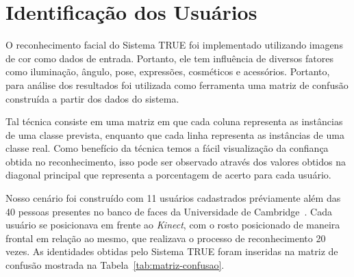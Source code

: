 \section{Identificação dos Usuários}
	 
	O reconhecimento facial do Sistema TRUE foi implementado utilizando imagens de cor como dados de entrada. Portanto, ele tem influência de diversos fatores como iluminação, ângulo, pose, expressões, cosméticos e acessórios. Portanto, para análise dos resultados foi utilizada como ferramenta uma matriz de confusão construída a partir dos dados do sistema.

	Tal técnica consiste em uma matriz em que cada coluna representa as instâncias de uma classe prevista, enquanto que cada linha representa as instâncias de uma classe real. Como benefício da técnica temos a fácil visualização da confiança obtida no reconhecimento, isso pode ser observado através dos valores obtidos na diagonal principal que representa a porcentagem de acerto para cada usuário.

	Nosso cenário foi construído com 11 usuários cadastrados préviamente além das 40 pessoas presentes no banco de faces da
	Universidade de Cambridge~\cite{cambridgeFaceDb}. Cada usuário se posicionava
	em frente ao \textit{Kinect}, com o rosto posicionado de maneira frontal em
	relação ao mesmo, que realizava o processo de reconhecimento 20 vezes. As
	identidades obtidas pelo Sistema TRUE foram inseridas na matriz de confusão
	mostrada na Tabela~\ref{tab:matriz-confusao}.
	
	
